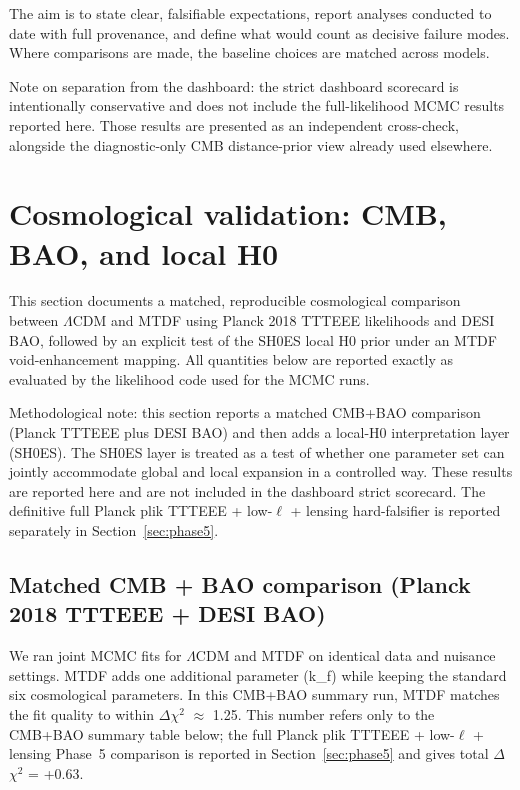\documentclass[11pt,a4paper]{article}
\begin{document}
The aim is to state clear, falsifiable expectations, report analyses conducted to date with full provenance, and define what would count as decisive failure modes. Where comparisons are made, the baseline choices are matched across models.

\begin{mdframed}[linecolor=accent,linewidth=0.5pt,backgroundcolor=callout-bg,leftline=true,rightline=true,topline=true,bottomline=true,innerleftmargin=8pt,innerrightmargin=8pt,innertopmargin=6pt,innerbottommargin=6pt]
Note on separation from the dashboard: the strict dashboard scorecard is intentionally conservative and does not include the full-likelihood MCMC results reported here. Those results are presented as an independent cross-check, alongside the diagnostic-only CMB distance-prior view already used elsewhere.
\end{mdframed}

\section{Cosmological validation: CMB, BAO, and local H0}
\label{sec:cosmo}
This section documents a matched, reproducible cosmological comparison between $\Lambda$CDM and MTDF using Planck 2018 TTTEEE likelihoods and DESI BAO, followed by an explicit test of the SH0ES local H0 prior under an MTDF void-enhancement mapping. All quantities below are reported exactly as evaluated by the likelihood code used for the MCMC runs.

\begin{mdframed}[linecolor=accent,linewidth=0.5pt,backgroundcolor=callout-bg,leftline=true,rightline=true,topline=true,bottomline=true,innerleftmargin=8pt,innerrightmargin=8pt,innertopmargin=6pt,innerbottommargin=6pt]
Methodological note: this section reports a matched CMB+BAO comparison (Planck TTTEEE plus DESI BAO) and then adds a local-H0 interpretation layer (SH0ES). The SH0ES layer is treated as a test of whether one parameter set can jointly accommodate global and local expansion in a controlled way. These results are reported here and are not included in the dashboard strict scorecard. The definitive full Planck plik TTTEEE + low-$\ell$ + lensing hard-falsifier is reported separately in Section~\ref{sec:phase5}.
\end{mdframed}

\subsection{Matched CMB + BAO comparison (Planck 2018 TTTEEE + DESI BAO)}
We ran joint MCMC fits for $\Lambda$CDM and MTDF on identical data and nuisance settings. MTDF adds one additional parameter (k\_\allowbreak{}f) while keeping the standard six cosmological parameters. In this CMB+BAO summary run, MTDF matches the fit quality to within $\Delta$$\chi$$^{2}$ $\approx$ 1.25. This number refers only to the CMB+BAO summary table below; the full Planck plik TTTEEE + low-$\ell$ + lensing Phase~5 comparison is reported in Section~\ref{sec:phase5} and gives total $\Delta$$\chi$$^{2}$ = +0.63.
\end{document}
